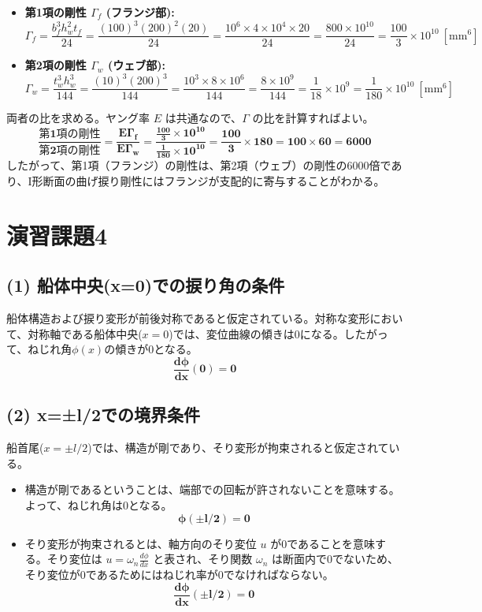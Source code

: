 \documentclass[a4j,12pt]{jsarticle}
\begin{document}
\begin{itemize}
    \item \textbf{第1項の剛性 $\Gamma_f$ (フランジ部):}
    $$\Gamma_f = \frac{b_f^3 h_w^2 t_f}{24} = \frac{(100)^3 (200)^2 (20)}{24} = \frac{10^6 \times 4 \times 10^4 \times 20}{24} = \frac{800 \times 10^{10}}{24} = \frac{100}{3} \times 10^{10} \ [\text{mm}^6]$$
    \item \textbf{第2項の剛性 $\Gamma_w$ (ウェブ部):}
    $$\Gamma_w = \frac{t_w^3 h_w^3}{144} = \frac{(10)^3 (200)^3}{144} = \frac{10^3 \times 8 \times 10^6}{144} = \frac{8 \times 10^9}{144} = \frac{1}{18} \times 10^9 = \frac{1}{180} \times 10^{10} \ [\text{mm}^6]$$
\end{itemize}
両者の比を求める。ヤング率 $E$ は共通なので、$\Gamma$ の比を計算すればよい。
$$\boldsymbol{\frac{\text{第1項の剛性}}{\text{第2項の剛性}} = \frac{E\Gamma_f}{E\Gamma_w} = \frac{\frac{100}{3} \times 10^{10}}{\frac{1}{180} \times 10^{10}} = \frac{100}{3} \times 180 = 100 \times 60 = 6000}$$
したがって、第1項（フランジ）の剛性は、第2項（ウェブ）の剛性の6000倍であり、I形断面の曲げ捩り剛性にはフランジが支配的に寄与することがわかる。

\newpage
\section*{演習課題4}
\subsection*{(1) 船体中央(x=0)での捩り角の条件}
船体構造および捩り変形が前後対称であると仮定されている。対称な変形において、対称軸である船体中央($x=0$)では、変位曲線の傾きは0になる。したがって、ねじれ角$\phi(x)$の傾きが0となる。
$$\boldsymbol{\frac{d\phi}{dx}(0) = 0}$$

\subsection*{(2) x=±l/2での境界条件}
船首尾($x=\pm l/2$)では、構造が剛であり、そり変形が拘束されると仮定されている。
\begin{itemize}
    \item 構造が剛であるということは、端部での回転が許されないことを意味する。よって、ねじれ角は0となる。
    $$\boldsymbol{\phi(\pm l/2) = 0}$$
    \item そり変形が拘束されるとは、軸方向のそり変位 $u$ が0であることを意味する。そり変位は $u = \omega_n \frac{d\phi}{dx}$ と表され、そり関数 $\omega_n$ は断面内で0でないため、そり変位が0であるためにはねじれ率が0でなければならない。
    $$\boldsymbol{\frac{d\phi}{dx}(\pm l/2) = 0}$$
\end{itemize}
\end{document}
